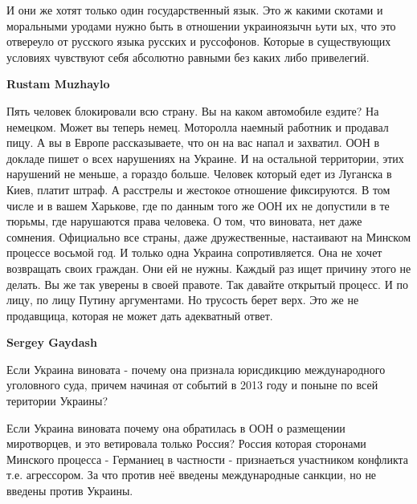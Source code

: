 \begin{itemize}
\begin{itemize}
И они же хотят только один государственный язык. Это ж какими скотами и
моральными уродами нужно быть в отношении украиноязычн ьути ых, что это
отвереуло от русского языка русских и руссофонов. Которые в существующих
условиях чувствуют себя абсолютно равными без каких либо привелегий.

 
\textbf{Rustam Muzhaylo} 

Пять человек блокировали всю страну. Вы на каком автомобиле ездите? На
немецком. Может вы теперь немец. Моторолла наемный работник и продавал пицу. А
вы в Европе рассказываете, что он на вас напал и захватил. ООН в докладе пишет
о всех нарушениях на Украине. И на остальной территории, этих нарушений не
меньше, а гораздо больше. Человек который едет из Луганска в Киев, платит
штраф. А расстрелы и жестокое отношение фиксируются. В том числе и в вашем
Харькове, где по данным того же ООН их не допустили в те тюрьмы, где нарушаются
права человека. О том, что виновата, нет даже сомнения. Официально все страны,
даже дружественные, настаивают на Минском процессе восьмой год. И только одна
Украина сопротивляется. Она не хочет возвращать своих граждан. Они ей не нужны.
Каждый раз ищет причину этого не делать. Вы же так уверены в своей правоте. Так
давайте открытый процесс. И по лицу, по лицу Путину аргументами. Но трусость
берет верх. Это же не продавщица, которая не может дать адекватный ответ.

 
\textbf{Sergey Gaydash}

Если Украина виновата - почему она признала юрисдикцию международного
уголовного суда, причем начиная от событий в 2013 году и поныне по всей
територии Украины?

Если Украина виновата почему она обратилась в ООН о размещении миротворцев, и
это ветировала только Россия? Россия которая сторонами Минского процесса -
Германиец в частности - признаеться участником конфликта т.е. агрессором. За
что против неё введены международные санкции, но не введены против Украины.


\end{itemize}
\end{itemize}
